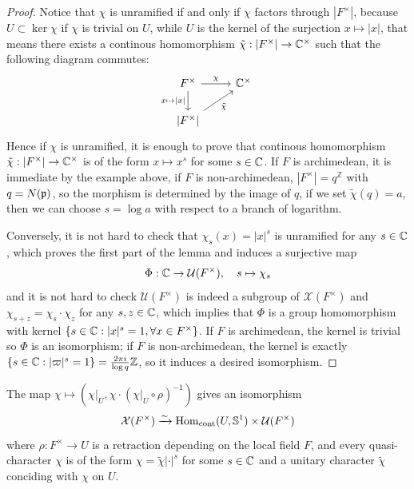 \begin{proof}
    Notice that \(\chi\) is unramified if and only if \(\chi\) factors through \(|F^\times| \), because \(U \subset \ker \chi\) if \(\chi\) is trivial on \(U\), while \(U\) is the kernel of the surjection \(x \mapsto |x|\),  that means there exists a continous homomorphism \(\tilde{\chi}: |F^\times| \to \mathbb{C}^\times\) such that the following diagram commutes: %
\[\begin{tikzcd}
	{F^\times} & {\mathbb{C}^\times} \\
	{|F^\times|}
	\arrow["\chi", from=1-1, to=1-2]
	\arrow["{x\mapsto |x|}"', from=1-1, to=2-1]
	\arrow["{\tilde{\chi}}"', from=2-1, to=1-2]
\end{tikzcd}\]
    Hence if \(\chi\) is unramified, it is enough to prove that continous homomorphism \(\tilde{\chi}:|F^\times| \to \mathbb{C}^\times\) is of the form \(x \mapsto x^s\) for some \(s \in \mathbb{C}\). If \(F \) is archimedean, it is immediate by the example above, if \(F\) is non-archimedean, \(|F^\times| = q^{\mathbb{Z}}\) with \(q = N(\mathfrak{p})\), so the morphism is determined by the image of \(q\), if we set \(\tilde{\chi}(q) = a\), then we can choose \(s = \log a \) with respect to a branch of logarithm. 

    Conversely, it is not hard to check that \(\chi_s(x) = |x|^s\) is unramified for any \(s \in \mathbb{C}\), which proves the first part of the lemma and induces a surjective map
    \[\Phi: \mathbb{C} \to \mathcal{U}(F^\times), \quad s \mapsto \chi_s\]
    and it is not hard to check \(\mathcal{U}(F^\times)\) is indeed a subgroup of \(\mathcal{X}(F^\times)\) and \(\chi_{s+z} = \chi_{s}\cdot\chi_{z}\) for any \(s,z \in \mathbb{C}\), which implies that \(\Phi\) is a group homomorphism with kernel \(\{s \in \mathbb{C} : |x|^s = 1 , \forall x \in F^\times \}\). If \(F\) is archimedean, the kernel is trivial so \(\Phi\) is an isomorphism; if \(F\) is non-archimedean, the kernel is exactly \(\{s \in \mathbb{C} : |\varpi|^s = 1 \} = \frac{2\pi i}{\log q}\mathbb{Z}\), so it induces a desired isomorphism.
\end{proof}

\begin{lemma}
    The map \(\chi \mapsto (\chi|_U,{\chi} \cdot ({\chi|_U \circ \rho})^{-1}) \) gives an isomorphism
        \[\mathcal{X}(F^\times) \xrightarrow{\sim} \operatorname{Hom}_{\text{cont}}(U,\mathbb{S}^1) \times \mathcal{U}(F^\times    )\]
    where \(\rho : F^\times \to U\) is a retraction depending on the local field \(F\), and every quasi-character \(\chi\) is of the form \(\chi = \tilde{\chi} |\cdot|^s\) for some \(s \in \mathbb{C}\) and a unitary character \(\tilde{\chi}\) conciding with \(\chi\) on \(U\).
\end{lemma}

